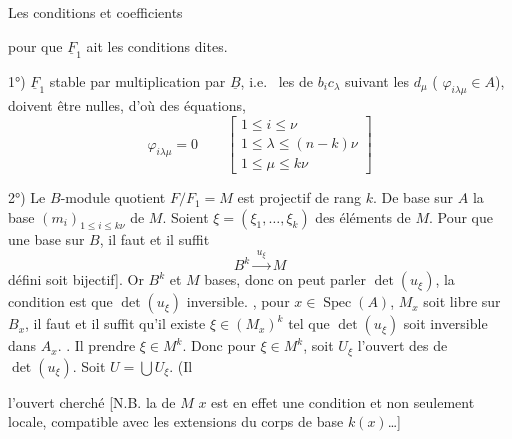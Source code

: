 \documentclass[11pt,a4paper]{article}
\begin{document}
Les  \struck{\ill{}} conditions  \ill{} et coefficients
\ill{}

pour que $\underline{F}_1$ ait les conditions dites. \struck{\ill{}}

1°) $\underline{F}_1$ stable par multiplication par $\underline{B}$,
i.e.\  les  de $b_i c_\lambda$ suivant
les $d_\mu$ ( $\varphi_{i\lambda\mu}\in A$), doivent être nulles, d'où des
équations,
\[
  \varphi_{i\lambda\mu}=0\qquad
  \begin{bmatrix}1\le i\le\nu\\ 1\le\lambda\le(n-k)\nu\\ 1\le\mu\le k\nu\end{bmatrix}
\]

2°) Le $B$-module quotient \struck{\ill{}} $F/F_1=M$ est projectif
de rang $k$. De \ill{} \ill{} base sur $A$ \ill{} la base $(m_i)_{1\le i\le k\nu}$
 de $M$. Soient $\xi=(\xi_1,\dots,\xi_k)$ des
éléments de $M$. Pour que  \ill{}  une base sur $B$, il faut et il suffit 
\[
  B^{k}\xrightarrow{\;u_\xi\;}M
\]
défini  \ill{} soit bijectif]. Or  $B^{k}$ et $M$
\ill{}  bases, donc on peut parler  $\det(u_\xi)$, la condition est que $\det(u_\xi)$ 
 inversible.  ,  \ill{} \ill{} pour $x\in\operatorname{Spec}(A)$,
$M_x$ soit libre sur $B_x$, il faut et il suffit qu'il existe
$\xi\in(M_x)^{k}$ tel que $\det(u_\xi)$ soit inversible dans $A_x$.
 \ill{} \ill{} \ill{}. Il    prendre $\xi\in M^{k}$. Donc
pour  \struck{\ill{}} $\xi\in M^{k}$, soit $U_\xi$
l'ouvert \ill{} des  de $\det(u_\xi)$. Soit $U=\bigcup U_\xi$. (Il

l'ouvert cherché [N.B. la   de $M$ 
$x$ est en effet une condition 
et non seulement locale,  compatible avec
les extensions du corps de base $k(x)$\ldots]
\end{document}
